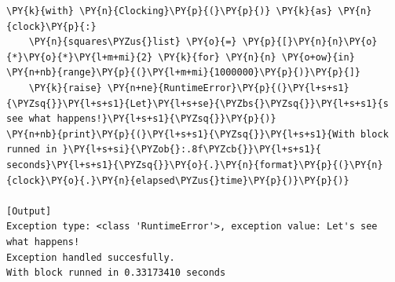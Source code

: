 \begin{Verbatim}[label=\makebox{\url{https://github.com/lucabaldini/cmepda/tree/master/slides/latex/snippets/context\_manager.py}},commandchars=\\\{\}]
\PY{k}{with} \PY{n}{Clocking}\PY{p}{(}\PY{p}{)} \PY{k}{as} \PY{n}{clock}\PY{p}{:}
    \PY{n}{squares\PYZus{}list} \PY{o}{=} \PY{p}{[}\PY{n}{n}\PY{o}{*}\PY{o}{*}\PY{l+m+mi}{2} \PY{k}{for} \PY{n}{n} \PY{o+ow}{in} \PY{n+nb}{range}\PY{p}{(}\PY{l+m+mi}{1000000}\PY{p}{)}\PY{p}{]}
    \PY{k}{raise} \PY{n+ne}{RuntimeError}\PY{p}{(}\PY{l+s+s1}{\PYZsq{}}\PY{l+s+s1}{Let}\PY{l+s+se}{\PYZbs{}\PYZsq{}}\PY{l+s+s1}{s see what happens!}\PY{l+s+s1}{\PYZsq{}}\PY{p}{)}
\PY{n+nb}{print}\PY{p}{(}\PY{l+s+s1}{\PYZsq{}}\PY{l+s+s1}{With block runned in }\PY{l+s+si}{\PYZob{}:.8f\PYZcb{}}\PY{l+s+s1}{ seconds}\PY{l+s+s1}{\PYZsq{}}\PY{o}{.}\PY{n}{format}\PY{p}{(}\PY{n}{clock}\PY{o}{.}\PY{n}{elapsed\PYZus{}time}\PY{p}{)}\PY{p}{)}

[Output]
Exception type: <class 'RuntimeError'>, exception value: Let's see what happens!
Exception handled succesfully.
With block runned in 0.33173410 seconds
\end{Verbatim}
